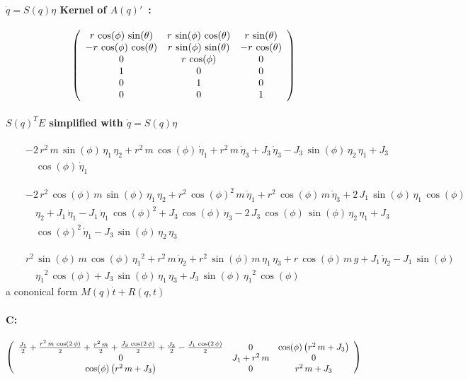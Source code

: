 \paragraph{$\dot{q}=S(q)\eta$ Kernel of $A(q)'$~:} 
$$ \left(\begin{array}{ccc} r\,\cos(\phi)\,\sin(\theta) & r\,\sin(\phi
)\,\cos(\theta) & r\,\sin(\theta) \cr -r\,\cos(\phi)\,\cos(\theta) & r
\,\sin(\phi)\,\sin(\theta) & -r\,\cos(\theta) \cr 0 & r\,\cos(\phi) & 
0 \cr 1 & 0 & 0 \cr 0 & 1 & 0 \cr 0 & 0 & 1 \end{array} \right) $$
\paragraph{$S(q)^T E$ simplified with $\dot{q}=S(q)\eta $} 


\begin{eqnarray*} && -2\,r^2\,m\,\sin(\phi)\,{\eta_1}\,{\eta_2}+r^2\,m
\,\cos(\phi)\,{\dot{\eta}_1}+r^2\,m\,{\dot{\eta}_3}+J_3\,{\dot{\eta}_3
}-J_3\,\sin(\phi)\,{\eta_2}\,{\eta_1}+J_3\, \\&&\quad{}\cos(\phi)\,{
\dot{\eta}_1} \end{eqnarray*}

\begin{eqnarray*} && -2\,r^2\,\cos(\phi)\,m\,\sin(\phi)\,{\eta_1}\,{
\eta_2}+r^2\,\cos(\phi)^2\,m\,{\dot{\eta}_1}+r^2\,\cos(\phi)\,m\,{
\dot{\eta}_3}+2\,J_1\,\sin(\phi)\,{\eta_1}\,\cos(\phi)\, \\&&\quad{}{
\eta_2}+J_1\,{\dot{\eta}_1}-J_1\,{\dot{\eta}_1}\,\cos(\phi)^2+J_3\,
\cos(\phi)\,{\dot{\eta}_3}-2\,J_3\,\cos(\phi)\,\sin(\phi)\,{\eta_2}\,{
\eta_1}+J_3\, \\&&\quad{}\cos(\phi)^2\,{\dot{\eta}_1}-J_3\,\sin(\phi)
\,{\eta_2}\,{\eta_3} \end{eqnarray*}

\begin{eqnarray*} && r^2\,\sin(\phi)\,m\,\cos(\phi)\,{{\eta_1}}^2+r^2
\,m\,{\dot{\eta}_2}+r^2\,\sin(\phi)\,m\,{\eta_1}\,{\eta_3}+r\,\cos(
\phi)\,m\,g+J_1\,{\dot{\eta}_2}-J_1\,\sin(\phi)\, \\&&\quad{}{{\eta_1}
}^2\,\cos(\phi)+J_3\,\sin(\phi)\,{\eta_1}\,{\eta_3}+J_3\,\sin(\phi)\,{
{\eta_1}}^2\,\cos(\phi) \end{eqnarray*}
a cononical form $M(q)\dot{t}+R(q,t)$
\paragraph{C:} 
$$ \left(\begin{array}{ccc} \frac{J_1}{2}+\frac{r^2\,m\,\cos(2\,\phi)
}{2}+\frac{r^2\,m}{2}+\frac{J_3\,\cos(2\,\phi)}{2}+\frac{J_3}{2}-
\frac{J_1\,\cos(2\,\phi)}{2} & 0 & \cos(\phi)\left(r^2\,m+J_3\right)
 \cr 0 & J_1+r^2\,m & 0 \cr \cos(\phi)\left(r^2\,m+J_3\right) & 0 & r^
2\,m+J_3 \end{array} \right) $$
